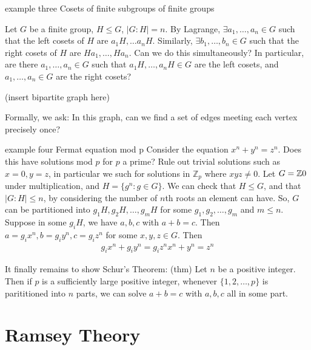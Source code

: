 \documentclass{article}
\begin{document}
example three
Cosets of finite subgroups of finite groups

Let $G$ be a finite group, $H \leq G$, $|G : H| = n$.  By Lagrange, $\exists a_1, \dots, a_n \in G$ such that the left cosets of $H$ are $a_1 H, \dots a_n H$.  Similarly, $\exists b_1, \dots, b_n \in G$ such that the right cosets of $H$ are $H a_1, \dots, H a_n$.
Can we do this simultaneously? In particular, are there $a_1, \dots, a_n \in G$ such that $a_1 H, \dots, a_n H \in G$ are the left cosets, and $a_1, \dots, a_n \in G$ are the right cosets?

(insert bipartite graph here)

Formally, we ask: In this graph, can we find a set of edges meeting each vertex precisely once?

example four
Fermat equation mod p
Consider the equation $x^n + y^n = z^n$. Does this have solutions mod $p$ for $p$ a prime?  Rule out trivial solutions such as $x = 0, y = z$, in particular we such for solutions in $\mathbb{Z}_p$ where $xyz \ne 0$.
Let $G = \mathbb{Z} \\ {0}$ under multiplication, and $H = \{g^n : g \in G\}$.  We can check that $H \leq G$, and that $|G : H| \leq n$, by considering the number of $n$th roots an element can have.  So, $G$ can be partitioned into $g_1 H, g_2 H, \dots, g_mH$ for some $g_1, g_2, \dots, g_m$ and $m \leq n$.  Suppose in some $g_i H$, we have $a, b, c$ with $a + b = c$.  Then $a = g_i x^n, b = g_i y^n, c = g_i z^n$ for some $x, y, z \in G$.  Then
\begin{align}
  g_i x^n + g_i y^n = g_i z^n
  x^n + y^n = z^n
\end{align}

It finally remains to show Schur's Theorem:
(thm) Let $n$ be a positive integer. Then if $p$ is a sufficiently large positive integer, whenever $\{1, 2, \dots, p\}$ is parititioned into $n$ parts, we can solve $a + b = c$ with $a, b, c$ all in some part.

\section{Ramsey Theory}
\end{document}
